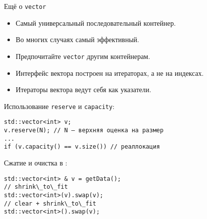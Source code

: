 \documentclass[aspectration=1610,t]{beamer}
\begin{document}
\begin{frame}[fragile]{Ещё о {\tt vector}}
 \begin{itemize}
     \item 	Самый универсальный последовательный контейнер. 

     \item Во многих случаях самый эффективный.
         
     \item Предпочитайте \texttt{vector} другим контейнерам.
 
     \item Интерфейс вектора построен на итераторах, а не на индексах.
 
     \item Итераторы вектора ведут себя как указатели.
\end{itemize}

\medskip
Использование {\tt reserve} и {\tt capacity}:
    \begin{lstlisting}
std::vector<int> v;
v.reserve(N); // N — верхняя оценка на размер
...
if (v.capacity() == v.size()) // реаллокация
    \end{lstlisting}

Сжатие и очистка в \langcpp[03]:
    \begin{lstlisting}
std::vector<int> & v = getData();
// shrink\_to\_fit
std::vector<int>(v).swap(v); 
// clear + shrink\_to\_fit 
std::vector<int>().swap(v);
    \end{lstlisting}

\medskip

\end{frame}
\end{document}
